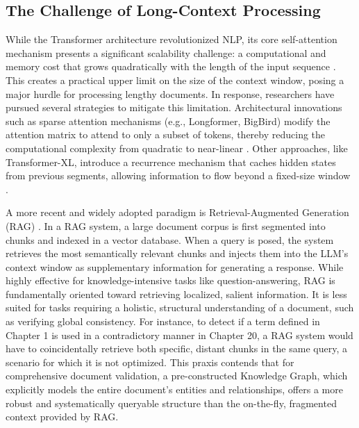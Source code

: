 \subsection{The Challenge of Long-Context Processing}
\label{subsec:long_context}
While the Transformer architecture revolutionized NLP, its core self-attention mechanism presents a significant scalability challenge: a computational and memory cost that grows quadratically with the length of the input sequence \parencite{RefWorks:RefID:81-vaswani2017attention}. This creates a practical upper limit on the size of the context window, posing a major hurdle for processing lengthy documents. In response, researchers have pursued several strategies to mitigate this limitation. Architectural innovations such as sparse attention mechanisms (e.g., Longformer, BigBird) modify the attention matrix to attend to only a subset of tokens, thereby reducing the computational complexity from quadratic to near-linear \parencite{RefWorks:RefID:183-beltagylongformer,RefWorks:RefID:184-zaheerbig}. Other approaches, like Transformer-XL, introduce a recurrence mechanism that caches hidden states from previous segments, allowing information to flow beyond a fixed-size window \parencite{RefWorks:RefID:185-2019transformerxl}.

A more recent and widely adopted paradigm is Retrieval-Augmented Generation (RAG) \parencite{RefWorks:RefID:158-lewis2020retrievalaugmented}. In a RAG system, a large document corpus is first segmented into chunks and indexed in a vector database. When a query is posed, the system retrieves the most semantically relevant chunks and injects them into the LLM's context window as supplementary information for generating a response. While highly effective for knowledge-intensive tasks like question-answering, RAG is fundamentally oriented toward retrieving localized, salient information. It is less suited for tasks requiring a holistic, structural understanding of a document, such as verifying global consistency. For instance, to detect if a term defined in Chapter 1 is used in a contradictory manner in Chapter 20, a RAG system would have to coincidentally retrieve both specific, distant chunks in the same query, a scenario for which it is not optimized. This praxis contends that for comprehensive document validation, a pre-constructed Knowledge Graph, which explicitly models the entire document's entities and relationships, offers a more robust and systematically queryable structure than the on-the-fly, fragmented context provided by RAG.

